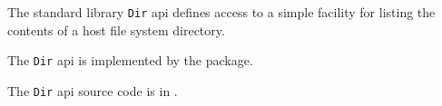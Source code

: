 
The standard library {\tt Dir} api defines access to a simple facility for listing 
the contents of a host file system directory.

The {\tt Dir} api is implemented by the  package.

The {\tt Dir} api source code is in .





